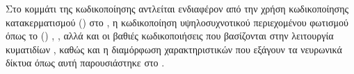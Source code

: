      Στο κομμάτι της κωδικοποίησης αντλείται ενδιαφέρον από την χρήση κωδικοποίησης κατακερματισμού () στο  \cite{mueller2022instant}, η κωδικοποίηση υψηλοσυχνοτικού περιεχομένου φωτισμού  όπως το () \cite{mildenhall2020nerf}, \cite{tancik2020fourier}, αλλά και οι βαθιές κωδικοποιήσεις που βασίζονται στην λειτουργία κυματιδίων  \cite{wu2023neural}, καθώς και η διαμόρφωση χαρακτηριστικών που εξάγουν τα νευρωνικά δίκτυα όπως αυτή παρουσιάστηκε στο  \cite{karras2020analyzing}.